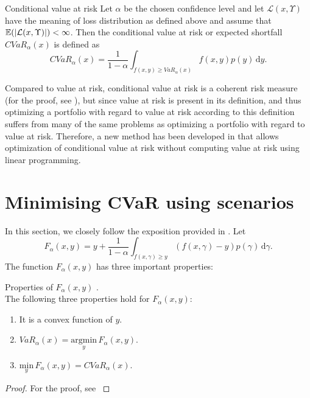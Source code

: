 \begin{defn}{Conditional value at risk \cite[p. 275]{cornuejols_tutuncu_2006}}
\label{cvar_definition}
Let $\alpha$ be the chosen confidence level and let $\mathcal{L}(x,\Upsilon)$ have the meaning of loss distribution as defined above and assume that $\mathbb{E}(\left|{\mathcal{L}(x,\Upsilon)}\right|)<\infty$. Then the conditional value at risk or expected shortfall $CVaR_{\alpha}(x)$ is defined as
\begin{equation}
CVaR_{\alpha}(x)=\frac{1}{1-\alpha}\int_{f(x,y) \geq VaR_{\alpha}(x)} f(x,y)p(y) \, \mathrm{d} y.
\end{equation}
\end{defn}
Compared to value at risk, conditional value at risk is a coherent risk measure (for the proof, see \cite[Example 2.26.]{mcneil2015quantitative}), but since value at risk is present in its definition, and thus optimizing a portfolio with regard to value at risk according to this definition suffers from many of the same problems as optimizing a portfolio with regard to value at risk. Therefore, a new method has been developed in \cite{Rockafellar2000OptimizationOC} that allows optimization of conditional value at risk without computing value at risk using linear programming.

\section{Minimising CVaR using scenarios}
In this section, we closely follow the exposition provided in \cite[p. 275-278]{cornuejols_tutuncu_2006}.
Let
\begin{equation}
\label{eq:cvar_approx}
F_{\alpha}(x,y)=y + \frac{1}{1-\alpha} \int_{f(x,\gamma) \geq y} (f(x,\gamma)-y)p(\gamma) \, \mathrm{d}\gamma.
\end{equation}
The function $F_{\alpha}(x,y)$ has three important properties:
\begin{lemma}{Properties of $F_{\alpha}(x,y)$ \cite[p. 276]{cornuejols_tutuncu_2006}.} \\
\label{lemma:properties_of_cvar_approx}
The following three properties hold for $F_{\alpha}(x,y)$:
\begin{enumerate}
	\item It is a convex function of $y$.
	\item $VaR_{\alpha}(x)=\underset{y}{\mathrm{argmin}} \, F_{\alpha}(x,y)$.
	\item $\underset{y}{\mathrm{min}} \, F_{\alpha}(x,y) = CVaR_{\alpha}(x)$.
\end{enumerate}
\end{lemma}
\begin{proof}
For the proof, see \cite[Theorems 1 and 2]{Rockafellar2000OptimizationOC}
\end{proof}

